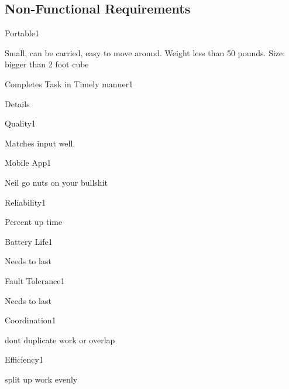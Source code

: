 \subsection{Non-Functional Requirements}
\label{sec:nonfunctional_requirements}

\begin{nonfunctional_requirement}{Portable}{1}
\item Small, can be carried, easy to move around. Weight less than 50 pounds. Size: bigger than 2 foot cube
\end{nonfunctional_requirement}

\begin{nonfunctional_requirement}{Completes Task in Timely manner}{1}
\item Details
\end{nonfunctional_requirement}

\begin{nonfunctional_requirement}{Quality}{1}
\item Matches input well. 
\end{nonfunctional_requirement}

\begin{nonfunctional_requirement}{Mobile App}{1}
\item Neil go nuts on your bullshit
\end{nonfunctional_requirement}

\begin{nonfunctional_requirement}{Reliability}{1}
\item Percent up time
\end{nonfunctional_requirement}

\begin{nonfunctional_requirement}{Battery Life}{1}
\item Needs to last
\end{nonfunctional_requirement}

\begin{nonfunctional_requirement}{Fault Tolerance}{1}
\item Needs to last
\end{nonfunctional_requirement}

\begin{nonfunctional_requirement}{Coordination}{1}
\item dont duplicate work or overlap
\end{nonfunctional_requirement}

\begin{nonfunctional_requirement}{Efficiency}{1}
\item split up work evenly
\end{nonfunctional_requirement}

